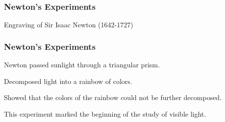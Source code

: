 \documentclass[12pt]{beamer}\usepackage[]{graphicx}\usepackage[]{color}
\begin{document}

\begin{frame}
\frametitle{Newton's Experiments}
\begin{center}

{\scriptsize {\lolit Engraving of Sir Isaac Newton (1642-1727)}}
\end{center}
\end{frame}


\begin{frame}
\frametitle{Newton's Experiments}

\bbi
  \item Newton passed sunlight through a triangular prism.
  \item Decomposed light into a rainbow of colors.
  \item Showed that the colors of the rainbow could not be further decomposed.
  \item This experiment marked the beginning of the study of visible light.
\ei

\end{frame}


{ %
    \begin{frame}[plain]
     \end{frame}
}
\end{document}
